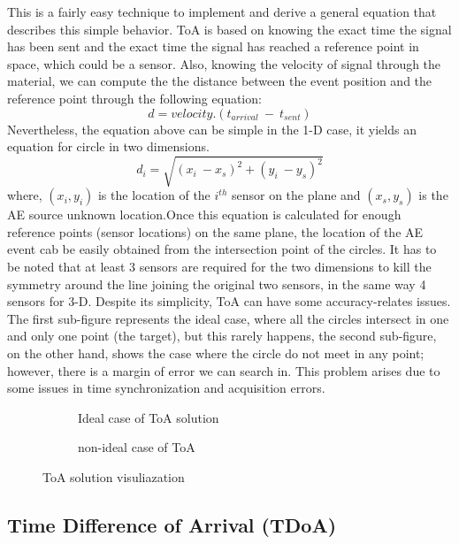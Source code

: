 This is a fairly easy technique to implement and derive a general
equation that describes this simple behavior. ToA is based on knowing
the exact time the signal has been sent and the exact time the signal
has reached a reference point in space, which could be a sensor. Also,
knowing the velocity of signal through the material, we can compute the
the distance between the event position and the reference point through
the following equation:\\
{\[d = velocity.(t_{arrival}\  - \ t_{sent})\]}Nevertheless, the
equation above can be simple in the 1-D case, it yields an equation for
circle in two dimensions.\\
{\[d_{i} = \sqrt{(x_{i}\  - x_{s})^{2} + (y_{i}\  - y_{s})^{2}}\]}where,
{\((x_{i},y_{i})\)} is the location of the {\(i^{th}\)} sensor on the
plane and {\((x_{s},y_{s})\)} is the AE source unknown location.Once
this equation is calculated for enough reference points (sensor
locations) on the same plane, the location of the AE event cab be easily
obtained from the intersection point of the circles. It has to be noted
that at least 3 sensors are required for the two dimensions to kill the
symmetry around the line joining the original two sensors, in the same
way 4 sensors for 3-D. Despite its simplicity, ToA can have some
accuracy-relates issues. The first sub-figure represents the ideal case,
where all the circles intersect in one and only one point (the target),
but this rarely happens, the second sub-figure, on the other hand, shows
the case where the circle do not meet in any point; however, there is a
margin of error we can search in. This problem arises due to some issues
in time synchronization and acquisition errors.

\begin{figure}[htp]
\begin{subfigure}{0.5\textwidth}
    \centering
   \scalebox{.9}{}
  \caption{Ideal case of ToA solution}
  \label{fig:sub1}
\end{subfigure}%
\begin{subfigure}{0.5\textwidth}
 \centering
   \scalebox{.9}{}
  \caption{non-ideal case of ToA}
  \label{fig:sub2}
\end{subfigure}
\caption{ToA solution visuliazation}
\label{fig:test}
\end{figure}


\subsection{Time Difference of Arrival
(TDoA)}


